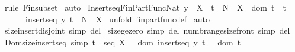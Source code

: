 \begin{isabellebody}
\isamarkupfalse%
\ {\isacharparenleft}rule\ Fin{\isacharunderscore}subset{\isacharparenright}\isanewline
{}\isamarkupfalse%
\ auto\isanewline
{}\isamarkupfalse%
%
\endisatagproof
{\isafoldproof}%
%
\isadelimproof
\isanewline
%
\endisadelimproof
\isanewline
\isanewline
\isanewline
{}\isamarkupfalse%
\ Insertseq{\isacharunderscore}Fin{\isacharunderscore}Part{\isacharunderscore}Func{\isacharunderscore}Nat{\isacharcolon}\ {\isachardoublequoteopen}{\isacharbrackleft}{\isacharbar}y\ {\isacharcolon}\ X\ {\isacharsemicolon}\ t\ {\isacharcolon}\ {\isacharparenleft}{\isacharpercent}N\ {\isacharminus}{\isacharbar}{\isacharbar}{\isacharminus}{\isachargreater}\ X{\isacharparenright}\ {\isacharsemicolon}\ {\isacharparenleft}{\isacharparenleft}dom\ t{\isacharparenright}\ {\isacharequal}\ {\isacharparenleft}{}{\isachardot}{\isachardot}{\isacharhash}t{\isacharparenright}{\isacharparenright}{\isacharbar}{\isacharbrackright}\ {\isacharequal}{\isacharequal}{\isachargreater}\ \ \isanewline
\ \ \ \ \ \ insertseq\ y\ t\ {\isacharcolon}\ {\isacharparenleft}{\isacharpercent}N\ {\isacharminus}{\isacharbar}{\isacharbar}{\isacharminus}{\isachargreater}\ X{\isacharparenright}{\isachardoublequoteclose}\isanewline
%
\isadelimproof
%
\endisadelimproof
%
\isatagproof
{}\isamarkupfalse%
\ {\isacharparenleft}unfold\ fin{\isacharunderscore}part{\isacharunderscore}func{\isacharunderscore}def{\isacharparenright}\isanewline
{}\isamarkupfalse%
\ auto\isanewline
{}\isamarkupfalse%
%
\endisatagproof
{\isafoldproof}%
%
\isadelimproof
\isanewline
%
\endisadelimproof
\isanewline
{}\isamarkupfalse%
\ size{\isacharunderscore}insert{\isacharunderscore}disjoint\ {\isacharbrackleft}simp\ del{\isacharbrackright}\isanewline
{}\isamarkupfalse%
\ size{\isacharunderscore}ge{\isacharunderscore}zero\ {\isacharbrackleft}simp\ del{\isacharbrackright}\ numb{\isacharunderscore}range{\isacharunderscore}size{\isacharunderscore}front\ {\isacharbrackleft}simp\ del{\isacharbrackright}\isanewline
\isanewline
{}\isamarkupfalse%
\ Dom{\isacharunderscore}size{\isacharunderscore}insert{\isacharunderscore}seq\ {\isacharbrackleft}simp{\isacharbrackright}{\isacharcolon}\ {\isachardoublequoteopen}t\ {\isacharcolon}\ seq\ X\ \ {\isacharequal}{\isacharequal}{\isachargreater}\ {\isacharhash}{\isacharparenleft}dom\ {\isacharparenleft}insertseq\ y\ t{\isacharparenright}{\isacharparenright}{\isacharequal}\ {}\ {\isacharplus}\ {\isacharparenleft}{\isacharhash}{\isacharparenleft}dom\ t{\isacharparenright}{\isacharparenright}{\isachardoublequoteclose}\isanewline

\end{isabellebody}
